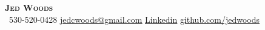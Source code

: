 \begin{center}
    \textbf{\Huge \scshape Jed Woods} \\ \vspace{1pt}
     \ \small 530-520-0428 \quad
    \href{mailto:jedcwodos@gmail.com}{ \underline{jedcwoods@gmail.com}} \quad
    \href{https://www.linkedin.com/in/jed-woods-bb007b1b1/}{ \underline{Linkedin}} \quad
    \href{https://github.com/jedwoods}{ \underline{github.com/jedwoods}}
\end{center}

